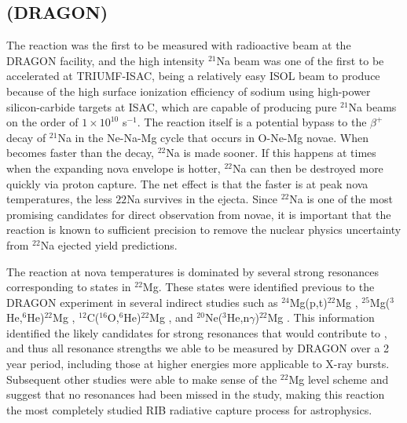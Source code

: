 \subsection{ (DRAGON)}
The  reaction was the first to be measured with radioactive beam at the DRAGON facility, and the high intensity $^{21}$Na beam was one of the first to be accelerated at TRIUMF-ISAC, being a relatively easy ISOL beam to produce because of the high surface ionization efficiency of sodium using high-power silicon-carbide targets at ISAC, which are capable of producing pure $^{21}$Na beams on the order of $1 \times 10^{10}$ s$^{-1}$. 
The  reaction itself is a potential bypass to the $\beta^{+}$ decay of $^{21}$Na in the Ne-Na-Mg cycle that occurs in O-Ne-Mg novae. When  becomes faster than the decay, $^{22}$Na is made sooner. If this happens at times when the expanding nova envelope is hotter, $^{22}$Na can then be destroyed more quickly via proton capture. The net effect is that the faster  is at peak nova temperatures, the less ${22}$Na survives in the ejecta. Since $^{22}$Na is one of the most promising candidates for direct observation from novae, it is important that the  reaction is known to sufficient precision to remove the nuclear physics uncertainty from $^{22}$Na ejected yield predictions.  

The  reaction at nova temperatures is dominated by several strong resonances corresponding to states in $^{22}$Mg. These states were identified previous to the DRAGON experiment in several indirect studies such as $^{24}$Mg(p,t)$^{22}$Mg \cite{bat01,mic02}, $^{25}$Mg($^{3}$He,$^{6}$He)$^{22}$Mg \cite{cag02}, $^{12}$C($^{16}$O,$^{6}$He)$^{22}$Mg \cite{che01}, and $^{20}$Ne($^{3}$He,n$\gamma$)$^{22}$Mg \cite{rol72}. 
This information identified the likely candidates for strong resonances that would contribute to , and thus all resonance strengths we able to be measured by DRAGON over a 2 year period, including those at higher energies more applicable to X-ray bursts. Subsequent other studies \cite{rui05,sew05} were able to make sense of the $^{22}$Mg level scheme and suggest that no resonances had been missed in the study, making this reaction the most completely studied RIB radiative capture process for astrophysics.  

